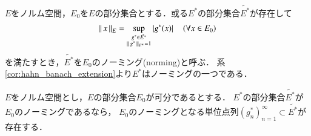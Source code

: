 	\begin{screen}
		\begin{dfn}[ノーミング]
			$E$をノルム空間，$E_0$を$E$の部分集合とする．或る$E^*$の部分集合$\tilde{E^*}$が存在して
			\begin{align}
				\left\|\, x\, \right\|_{E} = \operatorname*{sup}_{\substack{g^* \in \tilde{E^*} \\ \left\|\, g^*\, \right\|_{E^*} = 1}} \left| g^*(x) \right|
				\quad (\forall x \in E_0)
				\label{eq:dfn_norming}
			\end{align}
			を満たすとき，$\tilde{E^*}$を$E_0$のノーミング(norming)と呼ぶ．
			系\ref{cor:hahn_banach_extension}より$E^*$はノーミングの一つである．
		\end{dfn}
	\end{screen}
	
	\begin{screen}
		\begin{lem}[単位球面上にノーミングが存在する] 
			$E$をノルム空間とし，$E$の部分集合$E_0$が可分であるとする．
			$E^*$の部分集合$\tilde{E^*}$が$E_0$のノーミングであるなら，
			$E_0$のノーミングとなる単位点列$\left( g^*_n \right)_{n=1}^{\infty} \subset \tilde{E^*}$が存在する．
		\end{lem}
	\end{screen}
	

